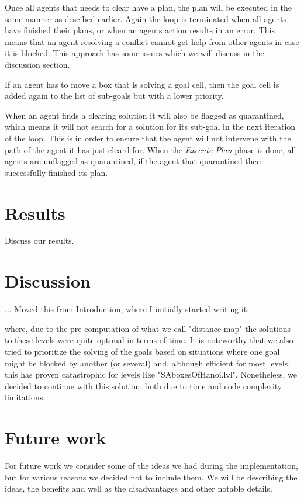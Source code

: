 \documentclass[letterpaper]{article}
\begin{document}
Once all agents that needs to clear have a plan, the plan will be executed in the same manner as descibed earlier. Again the loop is terminated when all agents have finished their plans, or when an agents action results in an error. This means that an agent resolving a conflict cannot get help from other agents in case it is blocked. This approach has some issues which we will discuss in the discussion section.

If an agent has to move a box that is solving a goal cell, then the goal cell is added again to the list of sub-goals but with a lower priority.

When an agent finds a clearing solution it will also be flagged as quarantined, which means it will not search for a solution for its sub-goal in the next iteration of the loop. This is in order to ensure that the agent will not intervene with the path of the agent it has just cleard for. When the \textit{Execute Plan} phase is done, all agents are unflagged as quarantined, if the agent that quarantined them successfully finished its plan. 


\section{Results}
Discuss our results.

\section{Discussion}
... Moved this from Introduction, where I initially started writing it:

where, due to the pre-computation of what we call "distance map" the solutions to these levels were quite optimal in terms of time. It is noteworthy that we also tried to prioritize the solving of the goals based on situations where one goal might be blocked by another (or several) and, although efficient for most levels, this has proven catastrophic for levels like "SAboxesOfHanoi.lvl". Nonetheless, we decided to continue with this solution, both due to time and code complexity limitations.

\section{Future work}
For future work we consider some of the ideas we had during the implementation, but for various reasons we decided not to include them. We will be describing the ideas, the benefits and well as the disadvantages and other notable details.
\end{document}
